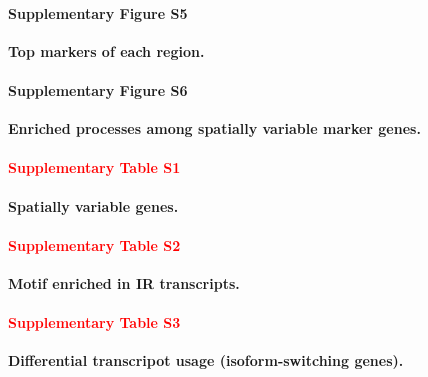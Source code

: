 \documentclass[utf8]{FrontiersinHarvard} %
\newcommand*{\red}{\textcolor{red}}
\begin{document}
\paragraph*{Supplementary Figure S5}
\label{fig:S5}
{\bf Top markers of each region.}

\paragraph*{Supplementary Figure S6}
\label{fig:S6}
{\bf Enriched processes among spatially variable marker genes.}


\paragraph*{\red{Supplementary Table S1}}
\label{tab:tabS1}
{\bf Spatially variable genes.}

\paragraph*{\red{Supplementary Table S2}}
\label{tab:tabS2}
{\bf Motif enriched in IR transcripts.}

\paragraph*{\red{Supplementary Table S3}}
\label{tab:tabS3}
{\bf Differential transcripot usage (isoform-switching genes).}



%

\end{document}
